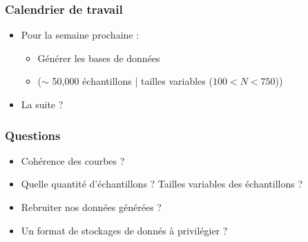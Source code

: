 \documentclass{beamer}
\begin{document}
\begin{frame}
  \frametitle{Calendrier de travail}
    \begin{itemize}
        \item Pour la semaine prochaine : 
        \begin{itemize}
            \item[\hspace{1cm}] Générer les bases de données 
            \item[\hspace{2cm}] ($\sim$ 50,000 échantillons | tailles variables ($100 < N < 750$))
        \end{itemize}
        \item La suite ?
    \end{itemize}
\end{frame}

\begin{frame}
  \frametitle{Questions}
  \begin{itemize}
    \item Cohérence des courbes ?
    \item Quelle quantité d'échantillons ? Tailles variables des échantillons ?
    \item Rebruiter nos données générées ? 
    \item Un format de stockages de donnés à privilégier ?
  \end{itemize}
\end{frame}

\end{document}
